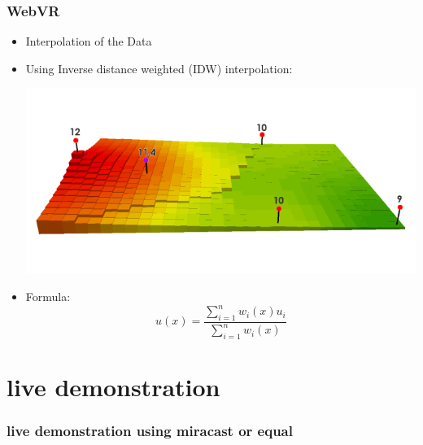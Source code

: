 \documentclass{beamer}
\begin{document}
\begin{frame}
\frametitle{WebVR}
\begin{itemize}
  \item Interpolation of the Data \pause
  \item Using Inverse distance weighted (IDW) interpolation:
  \begin{center}
  \includegraphics[scale=0.3]{IDW.png}
  \end{center}
  \pause
  \item Formula:
  $$
  u(x) = \frac{\sum_{i=1}^n w_i(x)u_i}{\sum_{i=1}^n w_i(x)}
  $$
\end{itemize}
\end{frame}

\section{live demonstration}
\begin{frame}
\frametitle{live demonstration using miracast or equal}

\end{frame}
\end{document}
